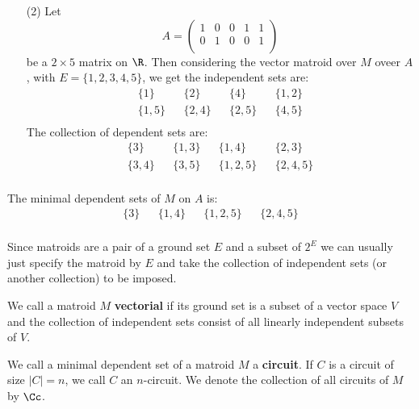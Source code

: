 \begin{example}
\begin{enumerate}
         \item[(2)] Let
             \begin{equation*}
                 A=\begin{pmatrix}
                    1   &   0   &   0   &   1   &   1   \\
                    0   &   1   &   0   &   0   &   1   \\
                   \end{pmatrix}
             \end{equation*}
             be a $2 \times 5$ matrix on $\R$. Then considering the vector
             matroid over $M$ oveer  $A$, with $E=\{1,2,3,4,5\}$, we get the
             independent sets are:
             \begin{align*}
                 \{1\}  && \{2\} && \{4\} && \{1,2\} \\
                \{1,5\} && \{2,4\} && \{2,5\} && \{4,5\} \\
             \end{align*}
             The collection of dependent sets are:
             \begin{align*}
                 \{3\} && \{1,3\} && \{1,4\} && \{2,3\} \\
                 \{3,4\} && \{3,5\} && \{1,2,5\} && \{2,4,5\} \\
             \end{align*}
    \end{enumerate}
    The minimal dependent sets of $M$ on  $A$ is:
    \begin{align*}
        \{3\} && \{1,4\} && \{1,2,5\} && \{2,4,5\} \\
    \end{align*}
\end{example}

\begin{remark}
    Since matroids are a pair of a ground set $E$ and a subset of $2^E$ we can
    usually just specify the matroid by $E$ and take the collection of
    independent sets (or another collection) to be imposed.
\end{remark}

\begin{definition}
    We call a matroid $M$ \textbf{vectorial} if its ground set is a subset of a
    vector space $V$ and the collection of independent sets consist of all
    linearly independent subsets of $V$.
\end{definition}

\begin{definition}
    We call a minimal dependent set of a matroid $M$ a  \textbf{circuit}. If $C$
    is a circuit of size  $|C|=n$, we call  $C$ an  $n$-circuit. We denote the
    collection of all circuits of  $M$ by  $\Cc$.
\end{definition}

